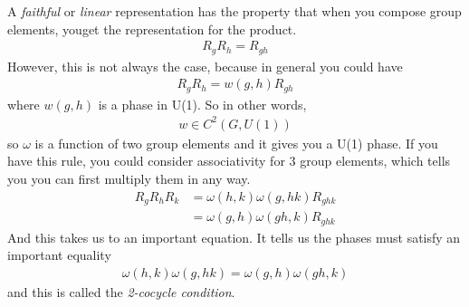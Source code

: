 A \emph{faithful} or \emph{linear} representation has the property that when you
compose group elements,
youget the representation for the product.
\begin{align}
    R_g R_h = R_{gh}
\end{align}
However, this is not always the case,
because in general you could have
\begin{align}
    R_g R_h = w(g, h) R_{gh}
\end{align}
where $w(g,h)$ is a phase in U(1).
So in other words,
\begin{align}
    w \in C^2(G, U(1))
\end{align}
so $\omega$ is a function of two group elements and it gives you a U(1) phase.
If you have this rule,
you could consider associativity for 3 group elements,
which tells you you can first multiply them in any way.
\begin{align}
    R_g R_h R_k &=
    \omega(h, k) \omega(g, hk) R_{ghk}\\
    &= \omega(g, h)\omega(gh, k) R_{ghk}
\end{align}
And this takes us to an important equation.
It tells us the phases must satisfy an important equality
\begin{align}
    \omega(h, k) \omega(g, hk)
    =
    \omega(g, h) \omega(gh, k)
\end{align}
and this is called the \emph{2-cocycle condition}.

